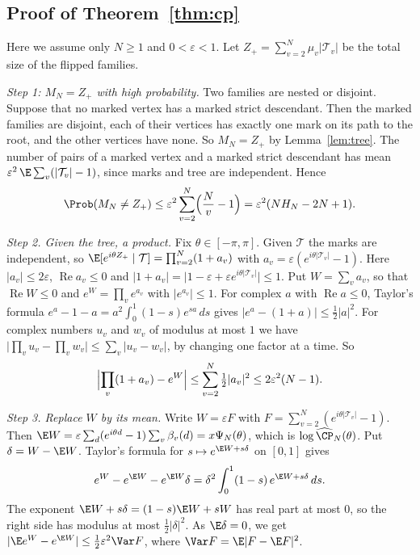 \subsection{Proof of Theorem~\ref{thm:cp}}\label{app:bulk-cp}

Here we assume only $N\ge1$ and $0<\varepsilon<1$. Let
$Z_+=\sum_{v=2}^N\mu_v\lvert\mathcal T_v\rvert$ be the total size of the
flipped families.

\emph{Step 1: $M_N=Z_+$ with high probability.} Two families are nested or
disjoint. Suppose that no marked vertex has a marked strict descendant. Then
the marked families are disjoint, each of their vertices has exactly one
mark on its path to the root, and the other vertices have none. So
$M_N=Z_+$ by Lemma~\ref{lem:tree}. The number of pairs of a marked vertex and
a marked strict descendant has mean
$\varepsilon^2\,\E\sum_v(\lvert\mathcal T_v\rvert-1)$, since marks and tree are
independent. Hence
\[
 \Prob(M_N\ne Z_+)\le\varepsilon^2\sum_{v=2}^N\Bigl(\frac Nv-1\Bigr)
 =\varepsilon^2(NH_N-2N+1).
\]

\emph{Step 2. Given the tree, a product.} Fix $\theta\in[-\pi,\pi]$. Given
$\mathcal T$ the marks are independent, so
$\E[e^{i\theta Z_+}\mid\mathcal T]=\prod_{v=2}^N(1+a_v)$ with
$a_v=\varepsilon(e^{i\theta\lvert\mathcal T_v\rvert}-1)$. Here
$\lvert a_v\rvert\le2\varepsilon$, $\operatorname{Re}a_v\le0$ and
$\lvert1+a_v\rvert=\lvert1-\varepsilon+\varepsilon e^{i\theta\lvert\mathcal T_v\rvert}\rvert\le1$.
Put $W=\sum_va_v$, so that $\operatorname{Re}W\le0$ and $e^W=\prod_ve^{a_v}$ with
$\lvert e^{a_v}\rvert\le1$. For complex $a$ with $\operatorname{Re}a\le0$, Taylor's formula
$e^a-1-a=a^2\int_0^1(1-s)e^{sa}\,ds$ gives $\lvert e^a-(1+a)\rvert\le\frac12\lvert a\rvert^2$. For
complex numbers $u_v$ and $w_v$ of modulus at most $1$ we have
$\lvert\prod_vu_v-\prod_vw_v\rvert\le\sum_v\lvert u_v-w_v\rvert$, by changing one factor at a
time. So
\[
 \Bigl\lvert\prod_v(1+a_v)-e^W\Bigr\rvert\le\sum_{v=2}^N\tfrac12\lvert a_v\rvert^2
 \le2\varepsilon^2(N-1).
\]

\emph{Step 3. Replace $W$ by its mean.} Write $W=\varepsilon F$ with
$F=\sum_{v=2}^N(e^{i\theta\lvert\mathcal T_v\rvert}-1)$. Then
$\E W=\varepsilon\sum_d(e^{i\theta d}-1)\sum_v\beta_v(d)=x\Psi_N(\theta)$,
which is $\log\widehat{\CP}_N(\theta)$. Put $\delta=W-\E W$. Taylor's formula
for $s\mapsto e^{\E W+s\delta}$ on $[0,1]$ gives
\[
 e^W-e^{\E W}-e^{\E W}\delta=\delta^2\int_0^1(1-s)\,e^{\E W+s\delta}\,ds .
\]
The exponent $\E W+s\delta=(1-s)\E W+sW$ has real part at most $0$, so the
right side has modulus at most $\frac12\lvert\delta\rvert^2$. As $\E\delta=0$,
we get $\lvert\E e^W-e^{\E W}\rvert\le\frac12\varepsilon^2\Var F$, where
$\Var F=\E\lvert F-\E F\rvert^2$.


